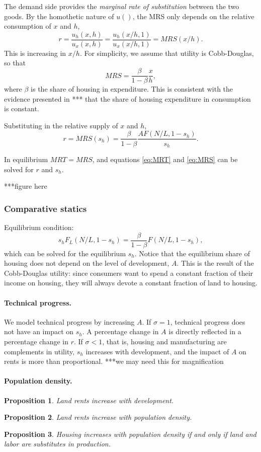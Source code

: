 \documentclass[12pt]{article}
\newtheorem{proposition}{Proposition}
\begin{document}
The demand side provides the \emph{marginal rate of substitution} between the two goods. By the homothetic nature of $u()$, the MRS only depends on the relative consumption of $x$ and $h$,
\[
r = \frac{u_h(x,h)}{u_x(x,h)} = \frac{u_h(x/h,1)}{u_x(x/h,1)} = MRS(x/h).
\]
This is increasing in $x/h$. For simplicity, we assume that utility is Cobb-Douglas, so that
\[
MRS = \frac{\beta}{1-\beta}\frac{x}{h},
\]
where $\beta$ is the share of housing in expenditure. This is consistent with the evidence presented in *** that the share of housing expenditure in consumption is constant.

Substituting in the relative supply of $x$ and $h$,
\begin{equation}\label{eq:MRS}
r = MRS(s_h) = \frac{\beta}{1-\beta}\frac{AF(N/L,1-s_h)}{s_h}.
\end{equation}

In equilibrium $MRT=MRS$, and equations \eqref{eq:MRT} and \eqref{eq:MRS} can be solved for $r$ and $s_h$.

***figure here

\subsubsection{Comparative statics}
Equilibrium condition:
\[
{s_hF_L(N/L,1-s_h)} = \frac{\beta}{1-\beta}F(N/L,1-s_h),
\]
which can be solved for the equilibrium $s_h$. Notice that the equilibrium share of housing does not depend on the level of development, $A$. This is the result of the Cobb-Douglas utility: since consumers want to spend a constant fraction of their income on housing, they will always devote a constant fraction of land to housing.

\paragraph{Technical progress.} We model technical progress by increasing $A$. If $\sigma=1$, technical progress does not have an impact on $s_h$. A percentage change in $A$ is directly reflected in a percentage change in $r$. If $\sigma<1$, that is, housing and manufacturing are complements in utility, $s_h$ increases with development, and the impact of $A$ on rents is more than proportional. ***we may need this for magnification
\paragraph{Population density.}

\begin{proposition}
Land rents increase with development.
\end{proposition}
\begin{proposition}
Land rents increase with population density.
\end{proposition}
\begin{proposition}
Housing increases with population density if and only if land and labor are substitutes in production.
\end{proposition}
\end{document}
